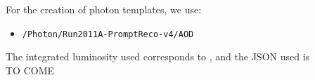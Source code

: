 For the creation of photon templates, we use:

\begin{itemize}
\item \verb=/Photon/Run2011A-PromptReco-v4/AOD=
\end{itemize}

The integrated luminosity used corresponds to \lumi, and the JSON used is 
\\
TO COME
